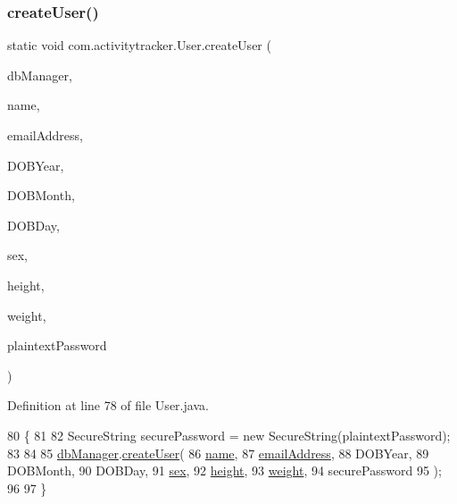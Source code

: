 \subsubsection{\texorpdfstring{create\+User()}{createUser()}}
{\footnotesize\ttfamily static void com.\+activitytracker.\+User.\+create\+User (\begin{DoxyParamCaption}\item[{final \mbox{\hyperlink{classcom_1_1activitytracker_1_1_d_b_manager}{D\+B\+Manager}}}]{db\+Manager,  }\item[{final String}]{name,  }\item[{final String}]{email\+Address,  }\item[{final int}]{D\+O\+B\+Year,  }\item[{final int}]{D\+O\+B\+Month,  }\item[{final int}]{D\+O\+B\+Day,  }\item[{final User.\+Sex}]{sex,  }\item[{final float}]{height,  }\item[{final float}]{weight,  }\item[{final String}]{plaintext\+Password }\end{DoxyParamCaption})\hspace{0.3cm}{\ttfamily [static]}}



Definition at line 78 of file User.\+java.


\begin{DoxyCode}
80                                                                                       \{
81 
82         SecureString securePassword = \textcolor{keyword}{new} SecureString(plaintextPassword);
83 
84 
85         \mbox{\hyperlink{classcom_1_1activitytracker_1_1_user_a8c8b36433447a235f2b4940b92e839c1}{dbManager}}.\mbox{\hyperlink{classcom_1_1activitytracker_1_1_d_b_manager_a39ef296348c7bfacf965b3417655f4e5}{createUser}}(
86                 \mbox{\hyperlink{classcom_1_1activitytracker_1_1_user_a49bfb4c8ebf8b7a377df01b5f0b2d7bc}{name}},
87                 \mbox{\hyperlink{classcom_1_1activitytracker_1_1_user_ac2fdb9a858d0295e52c5f8bc179e3137}{emailAddress}},
88                 DOBYear,
89                 DOBMonth,
90                 DOBDay,
91                 \mbox{\hyperlink{classcom_1_1activitytracker_1_1_user_adcbddd2e965af4e227f7cf0582a3e13d}{sex}},
92                 \mbox{\hyperlink{classcom_1_1activitytracker_1_1_user_a83cdfe6f520a4e18e8710e8e11f8c3d6}{height}},
93                 \mbox{\hyperlink{classcom_1_1activitytracker_1_1_user_a8a30c6c08983e513b462bcc035434c9e}{weight}},
94                 securePassword
95         );
96 
97     \}
\end{DoxyCode}
\mbox{\label{classcom_1_1activitytracker_1_1_user_a40da04454cea10bb5c6e6125a7a9cf64}} 
